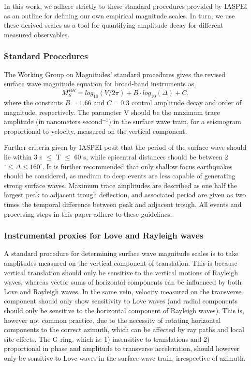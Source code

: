 \documentclass{gji}
\begin{document}
In this work, we adhere strictly to these standard procedures provided by IASPEI as an outline for defining our own empirical magnitude scales. In turn, we use these derived scales as a tool for quantifying amplitude decay for different measured observables.

\subsubsection{Standard Procedures}\label{standproc}
The Working Group on Magnitudes' standard procedures gives the revised surface wave magnitude equation for broad-band instruments as,
\begin{equation}\label{eq:mag}
	M_S^{BB} = log_{10}(V/2\pi) + B\cdot log_{10}(\Delta) + C, 
\end{equation}
where the constants $B=1.66$ and $C=0.3$ control amplitude decay and order of magnitude, respectively. The parameter V should be the maximum trace amplitude (in nanometers second$^{-1}$) in the surface wave train, for a seismogram proportional to velocity, measured on the vertical component. 

Further criteria given by IASPEI posit that the period of the surface wave should lie within 3 s $\le$ T $\le$ 60 s, while epicentral distances should be between 2$^\circ \le \Delta \le 160^\circ$. It is further recommended that only shallow focus earthquakes should be considered, as medium to deep events are less capable of generating strong surface waves. %
Maximum trace amplitudes are described as one half the largest peak to adjacent trough deflection, and associated period are given as two times the temporal difference between peak and adjacent trough. All events and processing steps in this paper adhere to these guidelines.

\subsubsection{Instrumental proxies for Love and Rayleigh waves}\label{proxy}
A standard procedure for determining surface wave magnitude scales is to take amplitudes measured on the vertical component of translation. This is because vertical translation should only be sensitive to the vertical motions of Rayleigh waves, whereas vector sums of horizontal components can be influenced by both Love and Rayleigh waves. In the same vein, velocity measured on the transverse component should only show sensitivity to Love waves (and radial components should only be sensitive to the horizontal component of Rayleigh waves). This is, however not common practice,  due to the necessity of rotating horizontal components to the correct azimuth, which can be affected by ray paths and local site effects. The G-ring, which is: 1) insensitive to translations and 2) proportional in phase and amplitude to transverse acceleration, should however only be sensitive to Love waves in the surface wave train, irrespective of azimuth.  
\end{document}
